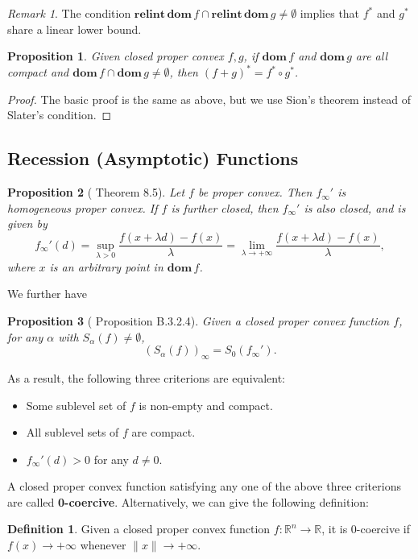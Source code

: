 \documentclass[openany]{book}
\newtheorem{proposition}{Proposition}[chapter]
\theoremstyle{definition}
\newtheorem{definition}{Definition}[chapter]
\theoremstyle{remark}
\newtheorem*{remark}{Remark}
\begin{document}
\begin{remark}
    The condition $\mathbf{relint}\,\mathbf{dom }\,f\cap \mathbf{relint}\,\mathbf{dom }\,g\ne\emptyset$ implies that $f^*$ and $g^*$ share a linear lower bound.
\end{remark}
\begin{proposition}
    Given closed proper convex $f,g$, if $\mathbf{dom }\,f$ and $\mathbf{dom }\,g$ are all compact and $\mathbf{dom }\,f\cap\mathbf{dom }\,g\ne\emptyset$, then $(f+g)^*=f^*\circ g^*$.
\end{proposition}
\begin{proof}
    The basic proof is the same as above, but we use Sion's theorem instead of Slater's condition.
\end{proof}

\subsection{Recession (Asymptotic) Functions}
\begin{proposition}[\cite{R15} Theorem 8.5]
    Let $f$ be proper convex. Then $f_{\infty}'$ is homogeneous proper convex. If $f$ is further closed, then $f_{\infty}'$ is also closed, and is given by
    \begin{equation}
        f_{\infty}'(d)=\sup_{\lambda>0}\frac{f(x+\lambda d)-f(x)}{\lambda}=\lim_{\lambda\to+\infty}\frac{f(x+\lambda d)-f(x)}{\lambda},
    \end{equation}
    where $x$ is an arbitrary point in $\mathbf{dom}\,f$.
\end{proposition}

We further have
\begin{proposition}[\cite{HL12} Proposition B.3.2.4]
    Given a closed proper convex function $f$, for any $\alpha$ with $S_{\alpha}(f)\ne\emptyset$,
    \begin{equation*}
        (S_{\alpha}(f))_{\infty}=S_0(f_{\infty}').
    \end{equation*}
\end{proposition}
As a result, the following three criterions are equivalent:
\begin{itemize}
    \item Some sublevel set of $f$ is non-empty and compact.
    \item All sublevel sets of $f$ are compact.
    \item $f_{\infty}'(d)>0$ for any $d\ne 0$.
\end{itemize}
A closed proper convex function satisfying any one of the above three criterions are called \textbf{0-coercive}. Alternatively, we can give the following definition:
\begin{definition}
    Given a closed proper convex function $f:\mathbb{R}^n\to \mathbb{R}$, it is $0$-coercive if $f(x)\to+\infty$ whenever $\|x\|\to+\infty$.
\end{definition}
\end{document}
